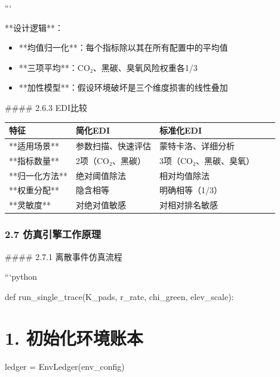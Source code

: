\documentclass[a4paper,12pt]{article}
\begin{document}
\par
```

\par
**设计逻辑**：

\par
\begin{itemize}
\item **均值归一化**：每个指标除以其在所有配置中的平均值
\end{itemize}
\begin{itemize}
\item **三项平均**：CO₂、黑碳、臭氧风险权重各1/3
\end{itemize}
\begin{itemize}
\item **加性模型**：假设环境破坏是三个维度损害的线性叠加
\end{itemize}
#### 2.6.3 EDI比较

\par
\begin{center}
\begin{longtable}{|l|l|l|l|l|}
\hline
特征 & 简化EDI & 标准化EDI \\ \hline
**适用场景** & 参数扫描、快速评估 & 蒙特卡洛、详细分析 \\ \hline
**指标数量** & 2项（CO₂、黑碳） & 3项（CO₂、黑碳、臭氧） \\ \hline
**归一化方法** & 绝对阈值除法 & 相对均值除法 \\ \hline
**权重分配** & 隐含相等 & 明确相等（1/3） \\ \hline
**灵敏度** & 对绝对值敏感 & 对相对排名敏感 \\ \hline
\end{longtable}
\end{center}
\subsubsection{2.7 仿真引擎工作原理}
#### 2.7.1 离散事件仿真流程

\par
```python

\par
def run\_single\_trace(K\_pads, r\_rate, chi\_green, elev\_scale):

\par
\section{1. 初始化环境账本}
ledger = EnvLedger(env\_config)

\par
\end{document}
